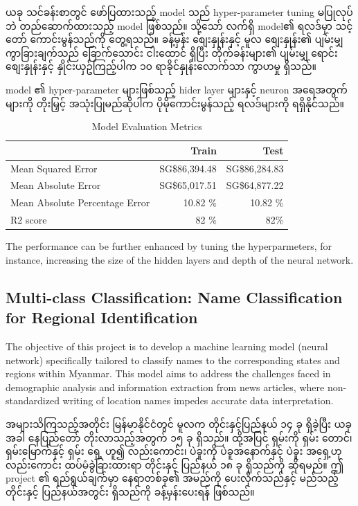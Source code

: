 ယခု သင်ခန်းစာတွင် ဖော်ပြထားသည့် model သည် hyper-parameter tuning  မပြုလုပ်ဘဲ တည်ဆောက်ထားသည့် model ဖြစ်သည်။  သို့သော် လက်ရှိ model၏ ရလဒ်မှာ သင့်တော် ကောင်းမွန်သည်ကို တွေ့ရသည်။ ခန့်မှန်း စျေးနှုန်းနှင့် မူလ စျေးနှုန်း၏ ပျမ်းမျှ ကွာခြားချက်သည် ခြောက်သောင်း ငါးထောင် ရှိပြီး တိုက်ခန်းများ၏ ပျမ်းမျှ ရောင်းစျေးနှုန်းနှင့် နှိုင်းယှဥ်ကြည့်ပါက ၁၀ ရာခိုင်နှုန်းလောက်သာ ကွာဟမှု ရှိသည်။ 

model ၏ hyper-parameter များဖြစ်သည့် hider layer များနှင့် neuron အရေအတွက်များကို တိုးမြှင့် အသုံးပြုမည်ဆိုပါက ပိုမိုကောင်းမွန်သည့် ရလဒ်များကို ရရှိနိုင်သည်။ 

\vspace{1em}

\begin{table}[htbp]
    \centering
    \caption{Model Evaluation Metrics}
    \label{tab:results}
    \begin{tabular}{l|r|r}
    \hline
    & \textbf{Train} & \textbf{Test} \\
    \hline
    Mean Squared Error & SG\$86,394.48 & SG\$86,284.83 \\
    Mean Absolute Error & SG\$65,017.51 & SG\$64,877.22 \\
    Mean Absolute Percentage Error & 10.82 \%& 10.82 \%\\
    R2 score & 82 \% & 82\% \\
    \hline
    \end{tabular}
\end{table}
\begin{remark}
The performance can be further enhanced by tuning the hyperparmeters, for instance, increasing the size of the hidden layers and depth of the neural network. 
\end{remark}
\newpage
\setcounter{stepcounter}{0}
\subsection{Multi-class Classification: Name Classification for Regional Identification} \label{sec:MMnames}
The objective of this project is to develop a machine learning model (neural network) specifically tailored to classify names to the corresponding states and regions within Myanmar. This model aims to address the challenges faced in demographic analysis and information extraction from news articles, where non-standardized writing of location names impedes accurate data interpretation.

အများသိကြသည့်အတိုင်း မြန်မာနိုင်ငံတွင် မူလက တိုင်းနှင့်ပြည်နယ် ၁၄ ခု ရှိခဲ့ပြီး ယခုအခါ နေပြည်တော် တိုးလာသည့်အတွက် ၁၅ ခု ရှိသည်။ ထို့အပြင် ရှမ်းကို ရှမ်း တောင်၊ ရှမ်းမြောက်နှင့် ရှမ်း ရှေ့ ဟူ၍ လည်းကောင်း၊ ပဲခူးကို ပဲခူအနောက်နှင့် ပဲခူး အရှေ့ဟု လည်းကောင်း ထပ်မံခွဲခြားထားရာ တိုင်းနှင့် ပြည်နယ် ၁၈ ခု ရှိသည်ကို ဆိုရမည်။ ဤ project ၏ ရည်ရွယ်ချက်မှာ နေရာတစ်ခု၏ အမည်ကို ပေးလိုက်သည်နှင့် မည်သည့် တိုင်းနှင့် ပြည်နယ်အတွင်း ရှိသည်ကို ခန့်မှန်းပေးရန် ဖြစ်သည်။ 

